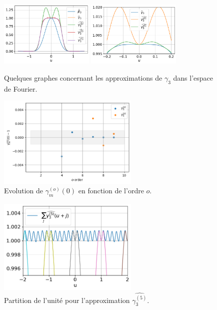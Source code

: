 \documentclass[11pt,twoside]{article}
\begin{document}
\begin{figure}
\centering
\includegraphics[width=0.4\textwidth]{fig14a.png}
\includegraphics[width=0.4\textwidth]{fig14b.png}
\caption{Quelques graphes concernant les approximations de $\gamma_3$ dans l'espace de Fourier.}
\label{fig-gamma3-approx-fourier}
\end{figure}


\begin{figure}
\centering
\includegraphics[width=0.6\textwidth]{fig12.png}
\caption{Evolution de $\gamma_m^{(o)}(0)$ en fonction de l'ordre $o$.}
\label{fig-gammaappat0}
\end{figure}


\begin{figure}
\centering
\includegraphics[width=0.6\textwidth]{fig14c.png}
\caption{Partition de l'unité pour l'approximation $\widehat{\gamma^{(5)}_3}$.}
\label{fig-gamma3-approx-unite-fourier}
\end{figure}
\end{document}
